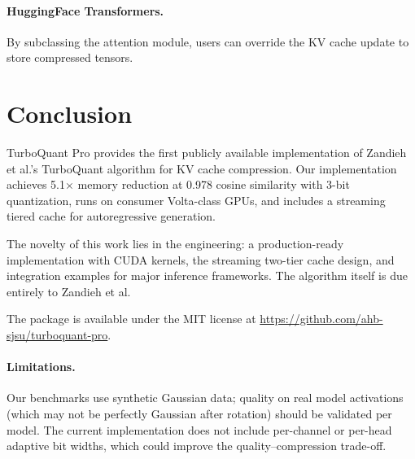 \documentclass{article}
\begin{document}
\paragraph{HuggingFace Transformers.}
By subclassing the attention module, users can override the KV cache
update to store compressed tensors.

\section{Conclusion}
\label{sec:conclusion}

TurboQuant Pro provides the first publicly available implementation of
Zandieh et al.'s TurboQuant algorithm for KV cache compression.
Our implementation achieves 5.1$\times$ memory reduction at 0.978 cosine
similarity with 3-bit quantization, runs on consumer Volta-class GPUs,
and includes a streaming tiered cache for autoregressive generation.

The novelty of this work lies in the engineering: a production-ready
implementation with CUDA kernels, the streaming two-tier cache design,
and integration examples for major inference frameworks.  The algorithm
itself is due entirely to Zandieh et al.

The package is available under the MIT license at
\url{https://github.com/ahb-sjsu/turboquant-pro}.

\paragraph{Limitations.}
Our benchmarks use synthetic Gaussian data; quality on real model
activations (which may not be perfectly Gaussian after rotation) should
be validated per model.  The current implementation does not include
per-channel or per-head adaptive bit widths, which could improve the
quality--compression trade-off.



\end{document}
